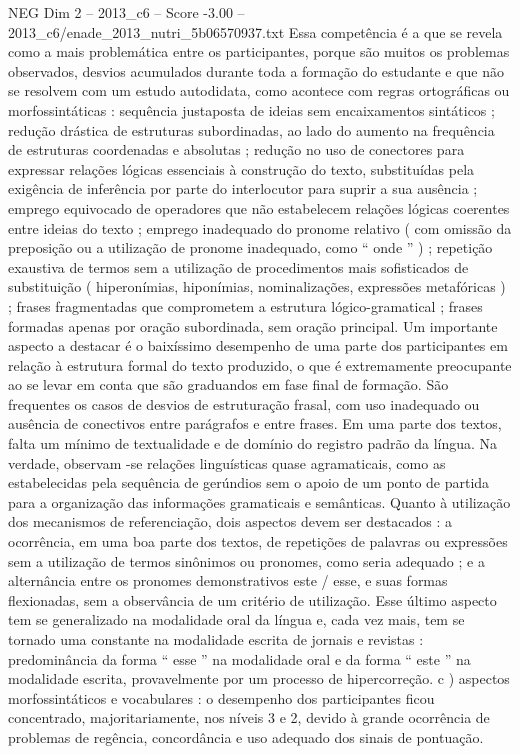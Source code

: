 \begin{textsample}{NEG Dim 2 – 2013\_c6 – Score -3.00 – 2013\_c6/enade\_2013\_nutri\_5b06570937.txt}
Essa competência é a que se revela como a mais problemática entre os participantes, porque são muitos os problemas observados, desvios acumulados durante toda a formação do estudante e que não se resolvem com um estudo autodidata, como acontece com regras ortográficas ou morfossintáticas : sequência justaposta de ideias sem encaixamentos sintáticos ; redução drástica de estruturas subordinadas, ao lado do aumento na frequência de estruturas coordenadas e absolutas ; redução no uso de conectores para expressar relações lógicas essenciais à construção do texto, substituídas pela exigência de inferência por parte do interlocutor para suprir a sua ausência ; emprego equivocado de operadores que não estabelecem relações lógicas coerentes entre ideias do texto ; emprego inadequado do pronome relativo ( com omissão da preposição ou a utilização de pronome inadequado, como “ onde ” ) ; repetição exaustiva de termos sem a utilização de procedimentos mais sofisticados de substituição ( hiperonímias, hiponímias, nominalizações, expressões metafóricas ) ; frases fragmentadas que comprometem a estrutura lógico-gramatical ; frases formadas apenas por oração subordinada, sem oração principal.
Um importante aspecto a destacar é o baixíssimo desempenho de uma parte dos participantes em relação à estrutura formal do texto produzido, o que é extremamente preocupante ao se levar em conta que são graduandos em fase final de formação.
São frequentes os casos de desvios de estruturação frasal, com uso inadequado ou ausência de conectivos entre parágrafos e entre frases.
Em uma parte dos textos, falta um mínimo de textualidade e de domínio do registro padrão da língua.
Na verdade, observam -se relações linguísticas quase agramaticais, como as estabelecidas pela sequência de gerúndios sem o apoio de um ponto de partida para a organização das informações gramaticais e semânticas.
Quanto à utilização dos mecanismos de referenciação, dois aspectos devem ser destacados : a ocorrência, em uma boa parte dos textos, de repetições de palavras ou expressões sem a utilização de termos sinônimos ou pronomes, como seria adequado ; e a alternância entre os pronomes demonstrativos este / esse, e suas formas flexionadas, sem a observância de um critério de utilização.
Esse último aspecto tem se generalizado na modalidade oral da língua e, cada vez mais, tem se tornado uma constante na modalidade escrita de jornais e revistas : predominância da forma “ esse ” na modalidade oral e da forma “ este ” na modalidade escrita, provavelmente por um processo de hipercorreção. c ) aspectos morfossintáticos e vocabulares : o desempenho dos participantes ficou concentrado, majoritariamente, nos níveis 3 e 2, devido à grande ocorrência de problemas de regência, concordância e uso adequado dos sinais de pontuação.

\end{textsample}
